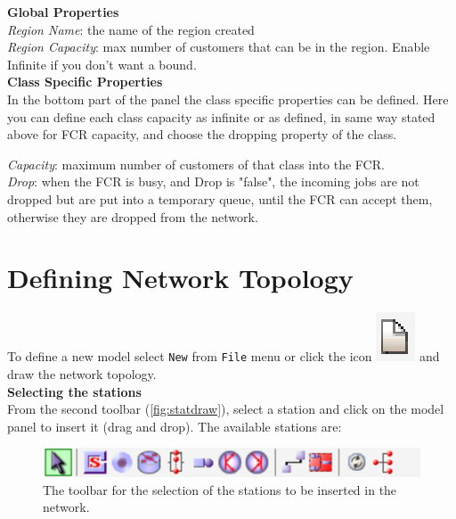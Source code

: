 \textbf{Global Properties}\\
 \emph{Region Name}: the name of the region
created\\
\emph{Region Capacity}: max number of customers that can be in the
region. Enable Infinite if you don't want a bound.\\

\textbf{Class Specific Properties}\\
 In the bottom part of the
panel the class specific properties can be defined. Here you can
define each class capacity as infinite or as defined, in same way
stated above for FCR capacity, and choose the dropping property of
the class.

\emph{Capacity}: maximum number of customers of that class into
the FCR.\\
\emph{Drop}: when the FCR is busy, and Drop is "false", the
incoming jobs are not dropped but are put into a temporary queue,
until the FCR can accept them, otherwise they are dropped from the
network.

\section{Defining Network Topology}
\label{defnettop}
To define a new model select \texttt{New} from \texttt{File} menu or
click the icon
\includegraphics[scale=.5]{img/jsimg/new.eps} and draw the
network topology.\\

\noindent \textbf{Selecting the stations}\\ From the second
toolbar (\autoref{fig:statdraw}), select a station and click on
the model panel to insert it (drag and drop). The available
stations
are:\\
\begin{figure}[h!]
    \begin{center}
        \includegraphics[scale=.5]{img/jsimg/8.4.eps}
    \end{center}
    \caption{The toolbar for the selection of the stations to be
    inserted in the network.}
    \label{fig:statdraw}
\end{figure}\\

